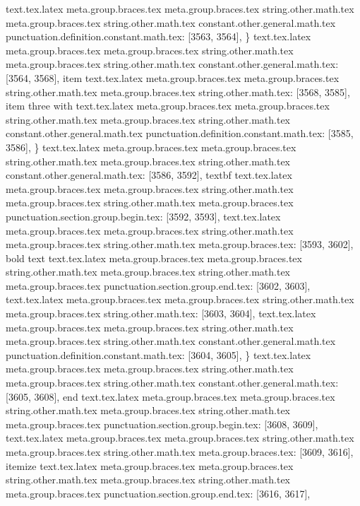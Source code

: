 {{{{{{{{{{{{{{{{{{{{{{{{{{{{{{{{{{{{{{{{{{{{{{{{{{{{{{{{{{{{{{{{{{{{{{{{{{{{{{{{{{{{{{{{{{{{{{{{{{{{{{{{{{{{{text.tex.latex meta.group.braces.tex meta.group.braces.tex string.other.math.tex meta.group.braces.tex string.other.math.tex constant.other.general.math.tex punctuation.definition.constant.math.tex: [3563, 3564], {\}
text.tex.latex meta.group.braces.tex meta.group.braces.tex string.other.math.tex meta.group.braces.tex string.other.math.tex constant.other.general.math.tex: [3564, 3568], {item}
text.tex.latex meta.group.braces.tex meta.group.braces.tex string.other.math.tex meta.group.braces.tex string.other.math.tex: [3568, 3585], { item three with }
text.tex.latex meta.group.braces.tex meta.group.braces.tex string.other.math.tex meta.group.braces.tex string.other.math.tex constant.other.general.math.tex punctuation.definition.constant.math.tex: [3585, 3586], {\}
text.tex.latex meta.group.braces.tex meta.group.braces.tex string.other.math.tex meta.group.braces.tex string.other.math.tex constant.other.general.math.tex: [3586, 3592], {textbf}
text.tex.latex meta.group.braces.tex meta.group.braces.tex string.other.math.tex meta.group.braces.tex string.other.math.tex meta.group.braces.tex punctuation.section.group.begin.tex: [3592, 3593], {{}
text.tex.latex meta.group.braces.tex meta.group.braces.tex string.other.math.tex meta.group.braces.tex string.other.math.tex meta.group.braces.tex: [3593, 3602], {bold text}
text.tex.latex meta.group.braces.tex meta.group.braces.tex string.other.math.tex meta.group.braces.tex string.other.math.tex meta.group.braces.tex punctuation.section.group.end.tex: [3602, 3603], {}}
text.tex.latex meta.group.braces.tex meta.group.braces.tex string.other.math.tex meta.group.braces.tex string.other.math.tex: [3603, 3604], {
}
text.tex.latex meta.group.braces.tex meta.group.braces.tex string.other.math.tex meta.group.braces.tex string.other.math.tex constant.other.general.math.tex punctuation.definition.constant.math.tex: [3604, 3605], {\}
text.tex.latex meta.group.braces.tex meta.group.braces.tex string.other.math.tex meta.group.braces.tex string.other.math.tex constant.other.general.math.tex: [3605, 3608], {end}
text.tex.latex meta.group.braces.tex meta.group.braces.tex string.other.math.tex meta.group.braces.tex string.other.math.tex meta.group.braces.tex punctuation.section.group.begin.tex: [3608, 3609], {{}
text.tex.latex meta.group.braces.tex meta.group.braces.tex string.other.math.tex meta.group.braces.tex string.other.math.tex meta.group.braces.tex: [3609, 3616], {itemize}
text.tex.latex meta.group.braces.tex meta.group.braces.tex string.other.math.tex meta.group.braces.tex string.other.math.tex meta.group.braces.tex punctuation.section.group.end.tex: [3616, 3617], {}}
}}}}}}}}}}}}}}}}}}}}}}}}}}}}}}}}}}}}}}}}}}}}}}}}}}}}}}}}}}}}}}}}}}}}}}}}}}}}}}}}}}}}}}}}}}}}}}}}}}}}}}}}}}}}}}}}
